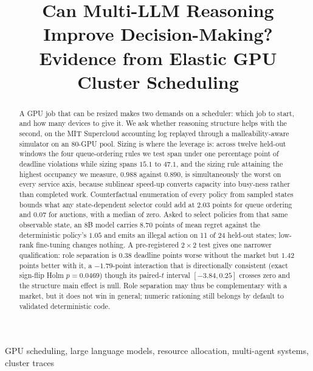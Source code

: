 \documentclass[conference]{IEEEtran}
\begin{document}
\title{Can Multi-LLM Reasoning Improve Decision-Making?\\
Evidence from Elastic GPU Cluster Scheduling}

\author{
}  %

\maketitle

\begin{abstract}
A GPU job that can be resized makes two demands on a scheduler: which job to start, and how many
devices to give it. We ask whether reasoning structure helps with the second, on the MIT
Supercloud accounting log replayed through a malleability-aware simulator on an $80$-GPU pool. Sizing
is where the leverage is: across twelve held-out windows the four queue-ordering rules we test span
under one percentage point of deadline violations while sizing spans $15.1$ to $47.1$, and the sizing
rule attaining the highest occupancy we measure, $0.988$ against $0.890$, is simultaneously the worst
on every service axis, because sublinear speed-up converts capacity into busy-ness rather than
completed work.
Counterfactual enumeration of every policy from sampled states bounds what any state-dependent
selector could add at $2.03$ points for queue ordering and $0.07$ for auctions, with a median of zero.
Asked to select policies from that same observable state, an 8B model carries $8.70$ points of mean
regret against the deterministic policy's $1.05$ and emits an illegal action on 11 of 24 held-out
states; low-rank fine-tuning changes nothing.  A pre-registered $2\times2$ test gives one narrower
qualification: role separation is $0.38$ deadline points worse without the market but $1.42$ points
better with it, a $-1.79$-point interaction that is directionally consistent (exact sign-flip Holm
$p=0.0469$) though its paired-$t$ interval $[-3.84,0.25]$ crosses zero and the structure main effect
is null.  Role separation may thus be complementary with a market, but it does not win in general;
numeric rationing still belongs by default to validated deterministic code.
\end{abstract}

\begin{IEEEkeywords}
GPU scheduling, large language models, resource allocation, multi-agent systems, cluster traces
\end{IEEEkeywords}
\end{document}
